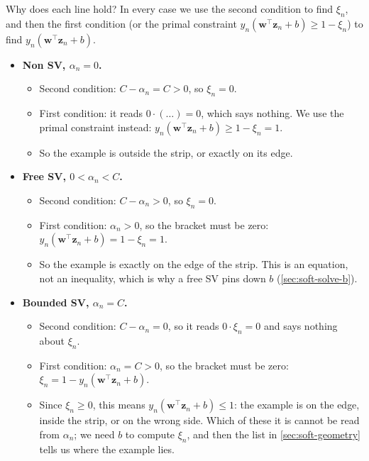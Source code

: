 Why does each line hold? In every case we use the second condition to find
\(\xi_n\), and then the first condition (or the primal constraint \(y_n
(\bm{w}^\top \bm{z}_n + b) \ge 1 - \xi_n\)) to find \(y_n (\bm{w}^\top
\bm{z}_n + b)\).
\begin{itemize}
    \item \textbf{Non SV, \(\alpha_n = 0\).}
        \begin{itemize}
            \item Second condition: \(C - \alpha_n = C > 0\), so \(\xi_n =
                0\).
            \item First condition: it reads \(0 \cdot (\ldots) = 0\), which
                says nothing. We use the primal constraint instead: \(y_n
                (\bm{w}^\top \bm{z}_n + b) \ge 1 - \xi_n = 1\).
            \item So the example is outside the strip, or exactly on its
                edge.
        \end{itemize}
    \item \textbf{Free SV, \(0 < \alpha_n < C\).}
        \begin{itemize}
            \item Second condition: \(C - \alpha_n > 0\), so \(\xi_n = 0\).
            \item First condition: \(\alpha_n > 0\), so the bracket must be
                zero: \(y_n (\bm{w}^\top \bm{z}_n + b) = 1 - \xi_n = 1\).
            \item So the example is exactly on the edge of the strip. This
                is an equation, not an inequality, which is why a free SV
                pins down \(b\) (\autoref{sec:soft-solve-b}).
        \end{itemize}
    \item \textbf{Bounded SV, \(\alpha_n = C\).}
        \begin{itemize}
            \item Second condition: \(C - \alpha_n = 0\), so it reads \(0
                \cdot \xi_n = 0\) and says nothing about \(\xi_n\).
            \item First condition: \(\alpha_n = C > 0\), so the bracket must
                be zero: \(\xi_n = 1 - y_n (\bm{w}^\top \bm{z}_n + b)\).
            \item Since \(\xi_n \ge 0\), this means \(y_n (\bm{w}^\top
                \bm{z}_n + b) \le 1\): the example is on the edge, inside the
                strip, or on the wrong side. Which of these it is cannot be
                read from \(\alpha_n\); we need \(b\) to compute \(\xi_n\),
                and then the list in \autoref{sec:soft-geometry} tells us
                where the example lies.
        \end{itemize}
\end{itemize}

